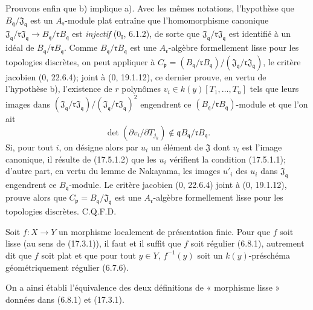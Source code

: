 Prouvons enfin que b) implique a). Avec les mêmes notations, l'hypothèse que $B_{\mathfrak q}/\mathfrak J_{\mathfrak q}$ est un $A_{\mathfrak r}$-module plat entraîne que l'homomorphisme canonique $\mathfrak J_{\mathfrak q}/\mathfrak r\mathfrak J_{\mathfrak q}\to B_{\mathfrak q}/\mathfrak rB_{\mathfrak q}$ est \emph{injectif} ($0_{\mathrm I}$, 6.1.2), de sorte que $\mathfrak J_{\mathfrak q}/\mathfrak r\mathfrak J_{\mathfrak q}$ est identifié à un idéal de $B_{\mathfrak q}/\mathfrak rB_{\mathfrak q}$. Comme $B_{\mathfrak q}/\mathfrak rB_{\mathfrak q}$ est une $A_{\mathfrak r}$-algèbre formellement lisse pour les topologies discrètes, on peut appliquer à $C_{\mathfrak p}=(B_{\mathfrak q}/\mathfrak rB_{\mathfrak q})/(\mathfrak J_{\mathfrak q}/\mathfrak r\mathfrak J_{\mathfrak q})$, le critère jacobien (0, 22.6.4); joint à (0, 19.1.12), ce dernier prouve, en vertu de l'hypothèse b), l'existence de $r$ polynômes $v_i\in k(y)[T_1,\ldots,T_n]$ tels que leurs images dans $(\mathfrak J_{\mathfrak q}/\mathfrak r\mathfrak J_{\mathfrak q})/(\mathfrak J_{\mathfrak q}/\mathfrak r\mathfrak J_{\mathfrak q})^2$ engendrent ce $(B_{\mathfrak q}/\mathfrak rB_{\mathfrak q})$-module et que l'on ait
\[
\label{IV.17.5.1.2}
\det(\partial v_i/\partial T_{j_k})\notin\mathfrak qB_{\mathfrak q}/\mathfrak rB_{\mathfrak q}.
\tag{17.5.1.2}
\]
Si, pour tout $i$, on désigne alors par $u_i$ un élément de $\mathfrak J$ dont $v_i$ est l'image canonique, il résulte de (17.5.1.2) que les $u_i$ vérifient la condition (17.5.1.1); d'autre part, en vertu du lemme de Nakayama, les images $u'_i$ des $u_i$ dans $\mathfrak J_{\mathfrak q}$ engendrent ce $B_{\mathfrak q}$-module. Le critère jacobien (0, 22.6.4) joint à (0, 19.1.12), prouve alors que $C_{\mathfrak p}=B_{\mathfrak q}/\mathfrak J_{\mathfrak q}$ est une $A_{\mathfrak r}$-algèbre formellement lisse pour les topologies discrètes. C.Q.F.D.

\begin{corollary}[17.5.2]
\label{IV.17.5.2}
Soit $f:X\to Y$ un morphisme localement de présentation finie. Pour que $f$ soit lisse (au sens de (17.3.1)), il faut et il suffit que $f$ soit régulier (6.8.1), autrement dit que $f$ soit plat et que pour tout $y\in Y$, $f^{-1}(y)$ soit un $k(y)$-préschéma géométriquement régulier (6.7.6).
\end{corollary}

On a ainsi établi l'équivalence des deux définitions de « morphisme lisse » données dans (6.8.1) et (17.3.1).

